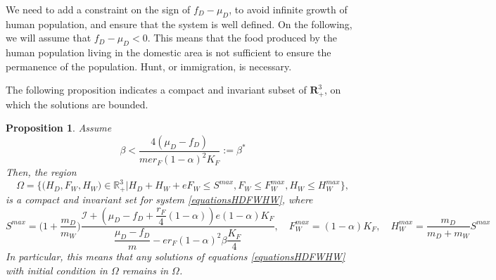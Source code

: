 \documentclass{article}
\newcommand{\cI}{\mathcal{I}}
\newtheorem{prop}{Proposition}
\begin{document}
We need to add a constraint on the sign of $f_D - \mu_D$, to avoid infinite growth of human population, and ensure that the system is well defined. On the following, we will assume that $f_D - \mu_D < 0$. This means that the food produced by the human population living in the domestic area is not sufficient to ensure the permanence of the population. Hunt, or immigration, is necessary. 

The following proposition indicates a compact and invariant subset of $\mathbf{R}_+^3$, on which the solutions are bounded.

\begin{prop}\label{invariantRegion} 
Assume 
\begin{equation*}
\beta < \dfrac{4(\mu_D - f_D)}{m e r_F (1-\alpha)^2 K_F} := \beta^*
\end{equation*}
Then, the region
$$\Omega = \Big\{\Big(H_D, F_W, H_W \Big) \in \mathbb{R}_+^3  \Big|H_D + H_W + eF_W \leq S^{max}, F_W \leq F_W^{max}, H_W \leq H_W^{max} \Big\},$$
is a compact and invariant set for system \eqref{equationsHDFWHW}, 
where
$$
S^{max} = \Big(1 + \dfrac{m_D}{m_W} \Big) \dfrac{\cI + \left(\mu_D - f_D + \dfrac{r_F}{4}(1-\alpha) \right) e (1-\alpha)K_F }{\dfrac{\mu_D - f_D}{m} - er_F (1-\alpha)^2 \beta \dfrac{K_F}{4}},
\quad
F_W^{max} = (1-\alpha)K_F,
\quad
H_W^{max} = \dfrac{m_D}{m_D + m_W} S^{max}
$$
In particular, this means that any solutions of equations \eqref{equationsHDFWHW} with initial condition in $\Omega$ remains in $\Omega$.
\end{prop}
%
\end{document}

